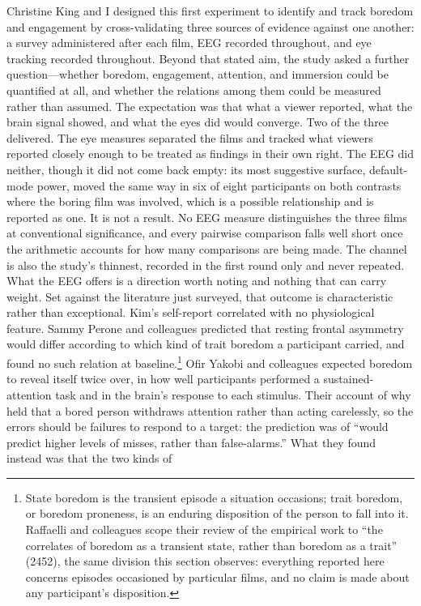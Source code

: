 Christine King and I designed this first experiment to identify and track boredom and
engagement by cross-validating three sources of evidence against one another: a survey
administered after each film, EEG recorded throughout, and eye tracking recorded throughout.
Beyond that stated aim, the study asked a further question---whether boredom, engagement,
attention, and immersion could be quantified at all, and whether the relations among them
could be measured rather than assumed. The expectation was that what a viewer reported, what
the brain signal showed, and what the eyes did would converge. Two of the three delivered. The eye measures separated the films and
tracked what viewers reported closely enough to be treated as findings in their own right. The
EEG did neither, though it did not come back empty: its most suggestive surface, default-mode
power, moved the same way in six of eight participants on both contrasts where the boring film
was involved, which is a possible relationship and is reported as one. It is not a result. No
EEG measure distinguishes the three films at conventional significance, and every pairwise
comparison falls well short once the arithmetic accounts for how many comparisons are being
made. The channel is also the study's thinnest, recorded in the first round only and never
repeated. What the EEG offers is a direction worth noting and nothing that can carry weight.
Set against the literature just surveyed, that outcome is characteristic rather than
exceptional. Kim's self-report correlated with no
physiological feature. Sammy
Perone and colleagues predicted that resting frontal asymmetry would differ according to which
kind of trait boredom a participant carried, and found no such relation at baseline.\footnote{
State boredom is the transient episode a situation occasions; trait boredom, or boredom
proneness, is an enduring disposition of the person to fall into it. Raffaelli and colleagues
scope their review of the empirical work to ``the correlates of boredom as a transient state, rather than boredom as a trait'' (2452), the same division this section
observes: everything reported here concerns episodes occasioned by particular films, and no
claim is made about any participant's disposition.} Ofir Yakobi and colleagues expected boredom
to reveal itself twice over, in how well participants performed a sustained-attention task and
in the brain's response to each stimulus. Their account of why held that a bored person
withdraws attention rather than acting carelessly, so the errors should be failures to respond
to a target: the prediction was of ``would predict higher levels of misses, rather than false-alarms.'' What they found instead was that the two kinds of
